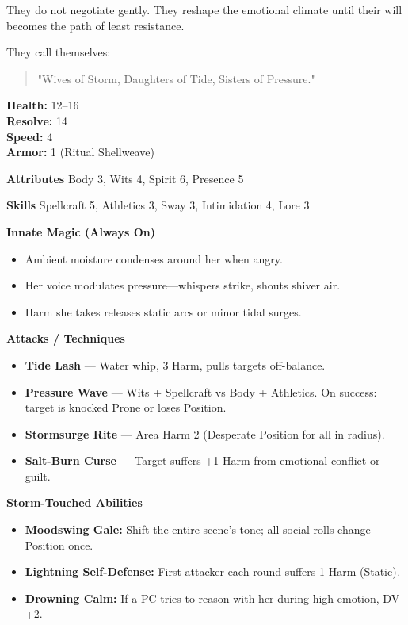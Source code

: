 \documentclass[11pt]{book}
\begin{document}
They do not negotiate gently. They reshape the emotional climate until their will becomes the path of least resistance.

They call themselves:
\begin{quote}
    "Wives of Storm, Daughters of Tide, Sisters of Pressure."
\end{quote}


\begin{dungeonstats}
\textbf{Health:} 12--16 \\
\textbf{Resolve:} 14 \\
\textbf{Speed:} 4 \\
\textbf{Armor:} 1 (Ritual Shellweave) \\
\end{dungeonstats}

\textbf{Attributes}  
Body 3, Wits 4, Spirit 6, Presence 5

\textbf{Skills}  
Spellcraft 5, Athletics 3, Sway 3, Intimidation 4, Lore 3

\textbf{Innate Magic (Always On)}  
\begin{itemize}
    \item Ambient moisture condenses around her when angry.
    \item Her voice modulates pressure---whispers strike, shouts shiver air.
    \item Harm she takes releases static arcs or minor tidal surges.
\end{itemize}

\textbf{Attacks / Techniques}
\begin{itemize}[leftmargin=*]
    \item \textbf{Tide Lash} --- Water whip, 3 Harm, pulls targets off-balance.
    \item \textbf{Pressure Wave} --- Wits + Spellcraft vs Body + Athletics.  
    On success: target is knocked Prone or loses Position.
    \item \textbf{Stormsurge Rite} --- Area Harm 2 (Desperate Position for all in radius).
    \item \textbf{Salt-Burn Curse} --- Target suffers +1 Harm from emotional conflict or guilt.
\end{itemize}

\textbf{Storm-Touched Abilities}
\begin{itemize}[leftmargin=*]
    \item \textbf{Moodswing Gale:} Shift the entire scene's tone; all social rolls change Position once.
    \item \textbf{Lightning Self-Defense:} First attacker each round suffers 1 Harm (Static).
    \item \textbf{Drowning Calm:} If a PC tries to reason with her during high emotion, DV +2.
\end{itemize}
\end{document}

